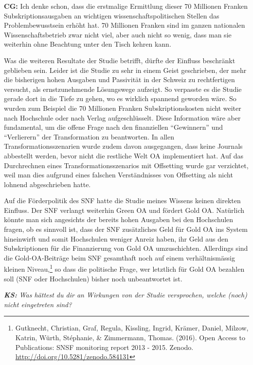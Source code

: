 \documentclass[a4paper,
fontsize=11pt,
oneside,
numbers=noperiodatend,
parskip=half-,
bibliography=totoc,
final
]{scrartcl}
\begin{document}
\textbf{CG:} Ich denke schon, dass die erstmalige Ermittlung dieser 70
Millionen Franken Subskriptionsausgaben an wichtigen
wissenschaftspolitischen Stellen das Problembewusstsein erhöht hat. 70
Millionen Franken sind im ganzen nationalen Wissenschaftsbetrieb zwar
nicht viel, aber auch nicht so wenig, dass man sie weiterhin ohne
Beachtung unter den Tisch kehren kann.

Was die weiteren Resultate der Studie betrifft, dürfte der Einfluss
beschränkt geblieben sein. Leider ist die Studie zu sehr in einem Geist
geschrieben, der mehr die bisherigen hohen Ausgaben und Passivität in
der Schweiz zu rechtfertigen versucht, als ernstzunehmende Lösungswege
aufzeigt. So verpasste es die Studie gerade dort in die Tiefe zu gehen,
wo es wirklich spannend geworden wäre. So wurden zum Beispiel die 70
Millionen Franken Subskriptionskosten nicht weiter nach Hochschule oder
nach Verlag aufgeschlüsselt. Diese Information wäre aber fundamental, um
die offene Frage nach den finanziellen \enquote{Gewinnern} und
\enquote{Verlierern} der Transformation zu beantworten. In allen
Transformationsszenarien wurde zudem davon ausgegangen, dass keine
Journals abbestellt werden, bevor nicht die restliche Welt OA
implementiert hat. Auf das Durchrechnen eines Transformationsszenarios
mit Offsetting wurde gar verzichtet, weil man dies aufgrund eines
falschen Verständnisses von Offsetting als nicht lohnend abgeschrieben
hatte.

Auf die Förderpolitik des SNF hatte die Studie meines Wissens keinen
direkten Einfluss. Der SNF verlangt weiterhin Green OA und fördert Gold
OA. Natürlich könnte man sich angesichts der bereits hohen Ausgaben bei
den Hochschulen fragen, ob es sinnvoll ist, dass der SNF zusätzliches
Geld für Gold OA ins System hineinwirft und somit Hochschulen weniger
Anreiz haben, ihr Geld aus den Subskriptionen für die Finanzierung von
Gold OA umzuschichten. Allerdings sind die Gold-OA-Beiträge beim SNF
gesamthaft noch auf einem verhältnismässig kleinen Niveau,\footnote{Gutknecht,
  Christian, Graf, Regula, Kissling, Ingrid, Krämer, Daniel, Milzow,
  Katrin, Würth, Stéphanie, \& Zimmermann, Thomas. (2016). Open Access
  to Publications: SNSF monitoring report 2013 - 2015. Zenodo.
  \url{http://doi.org/10.5281/zenodo.584131}} so dass die politische
Frage, wer letztlich für Gold OA bezahlen soll (SNF oder Hochschulen)
bisher noch unbeantwortet ist.

\emph{\textbf{KS:} Was hättest du dir an Wirkungen von der Studie
versprochen, welche (noch) nicht eingetreten sind?}
\end{document}
